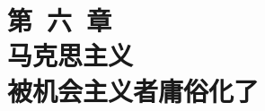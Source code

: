 \documentclass{CR} %
\begin{document}
\part[第六章]{第~六~章 \\ 马克思主义\\被机会主义者庸俗化了}  



\clearpage\thispagestyle{empty}\cleardoublepage

\clearpage\thispagestyle{empty}\cleardoublepage



\clearpage\thispagestyle{empty}\cleardoublepage






\end{document}
